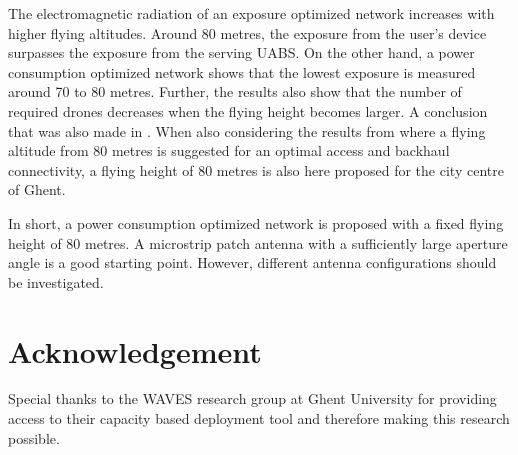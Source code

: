 \documentclass[twocolumn]{phdsymp} %
\begin{document}
The electromagnetic radiation of an exposure optimized network increases with higher flying altitudes.
Around 80 metres, the exposure from the  user's device surpasses the exposure from the serving \gls{UABS}.
On the other hand, a power consumption optimized network shows that the lowest exposure is measured around 70 to 80 metres.
Further, the results also show that the number of required drones decreases when the flying height becomes larger. 
A conclusion that was also made in \cite{J2}.
When also considering the results from \cite{U1} where a flying altitude from 
80 metres is suggested for an optimal access and backhaul connectivity, a flying height 
of 80 metres is also here proposed for the city centre of Ghent.

In short, a power consumption optimized network is proposed with a fixed flying height of 80 metres. A microstrip patch 
antenna with a sufficiently large aperture angle is a good starting point. However, different antenna configurations should 
be investigated.

\section*{Acknowledgement}
Special thanks to the WAVES research group at Ghent University for providing 
access to their capacity based deployment tool and therefore making this research possible.



\end{document}
